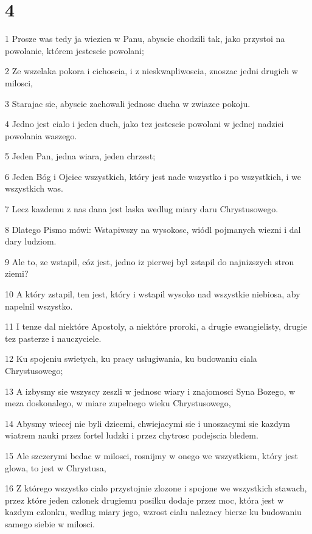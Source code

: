 \chapter{4}

\par 1 Prosze was tedy ja wiezien w Panu, abyscie chodzili tak, jako przystoi na powolanie, którem jestescie powolani;
\par 2 Ze wszelaka pokora i cichoscia, i z nieskwapliwoscia, znoszac jedni drugich w milosci,
\par 3 Starajac sie, abyscie zachowali jednosc ducha w zwiazce pokoju.
\par 4 Jedno jest cialo i jeden duch, jako tez jestescie powolani w jednej nadziei powolania waszego.
\par 5 Jeden Pan, jedna wiara, jeden chrzest;
\par 6 Jeden Bóg i Ojciec wszystkich, który jest nade wszystko i po wszystkich, i we wszystkich was.
\par 7 Lecz kazdemu z nas dana jest laska wedlug miary daru Chrystusowego.
\par 8 Dlatego Pismo mówi: Wstapiwszy na wysokosc, wiódl pojmanych wiezni i dal dary ludziom.
\par 9 Ale to, ze wstapil, cóz jest, jedno iz pierwej byl zstapil do najnizszych stron ziemi?
\par 10 A który zstapil, ten jest, który i wstapil wysoko nad wszystkie niebiosa, aby napelnil wszystko.
\par 11 I tenze dal niektóre Apostoly, a niektóre proroki, a drugie ewangielisty, drugie tez pasterze i nauczyciele.
\par 12 Ku spojeniu swietych, ku pracy uslugiwania, ku budowaniu ciala Chrystusowego;
\par 13 A izbysmy sie wszyscy zeszli w jednosc wiary i znajomosci Syna Bozego, w meza doskonalego, w miare zupelnego wieku Chrystusowego,
\par 14 Abysmy wiecej nie byli dziecmi, chwiejacymi sie i unoszacymi sie kazdym wiatrem nauki przez fortel ludzki i przez chytrosc podejscia bledem.
\par 15 Ale szczerymi bedac w milosci, rosnijmy w onego we wszystkiem, który jest glowa, to jest w Chrystusa,
\par 16 Z którego wszystko cialo przystojnie zlozone i spojone we wszystkich stawach, przez które jeden czlonek drugiemu posilku dodaje przez moc, która jest w kazdym czlonku, wedlug miary jego, wzrost cialu nalezacy bierze ku budowaniu samego siebie w milosci.
